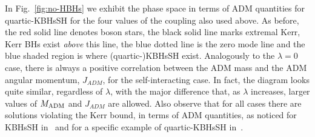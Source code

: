 In Fig.~\ref{fig:no-HBHs} we exhibit the phase space in terms of ADM quantities for quartic-KBHsSH for the four values of the coupling also used above. As before, the red solid line denotes boson stars, the black solid line marks extremal Kerr, Kerr BHs exist \textit{above} this line, the blue dotted line is the zero mode line and the blue shaded region is where (quartic-)KBHsSH exist. Analogously to the $\lambda=0$ case, there is always a positive correlation between the ADM mass and the ADM angular momentum, $J_{ADM}$, for the self-interacting case. In fact, the diagram looks quite similar, regardless of $\lambda$, with the major difference that, as $\lambda$ increases, larger values of $M_{\rm ADM}$ and $J_{ADM}$ are allowed. Also observe that for all cases there are solutions violating the Kerr bound, in terms of ADM quantities, as noticed for KBHsSH in~\cite{Herdeiro:2014goa,Herdeiro:2015moa} and for a specific example of quartic-KBHsSH in~\cite{Kleihaus:2015iea}.



